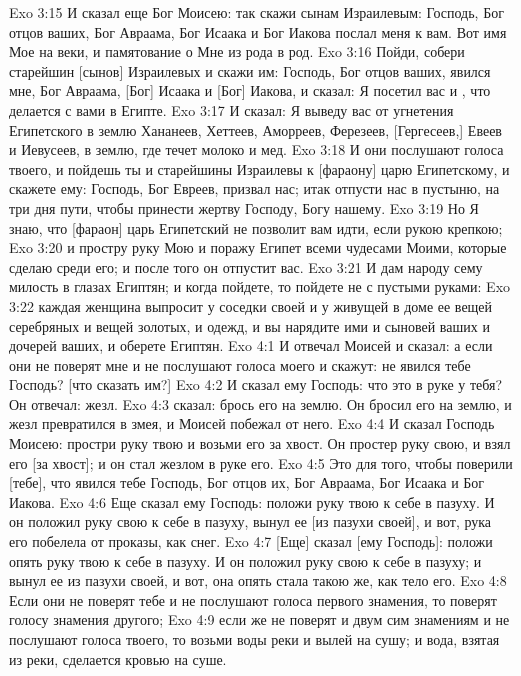 \vs Exo 3:15 И сказал еще Бог Моисею: так скажи сынам Израилевым: Господь, Бог отцов ваших, Бог Авраама, Бог Исаака и Бог Иакова послал меня к вам. Вот имя Мое на веки, и памятование о Мне из рода в род.
\vs Exo 3:16 Пойди, собери старейшин [сынов] Израилевых и скажи им: Господь, Бог отцов ваших, явился мне, Бог Авраама, [Бог] Исаака и [Бог] Иакова, и сказал: Я посетил вас и , что делается с вами в Египте.
\vs Exo 3:17 И сказал: Я выведу вас от угнетения Египетского в землю Хананеев, Хеттеев, Аморреев, Ферезеев, [Гергесеев,] Евеев и Иевусеев, в землю, где течет молоко и мед.
\vs Exo 3:18 И они послушают голоса твоего, и пойдешь ты и старейшины Израилевы к [фараону] царю Египетскому, и скажете ему: Господь, Бог Евреев, призвал нас; итак отпусти нас в пустыню, на три дня пути, чтобы принести жертву Господу, Богу нашему.
\vs Exo 3:19 Но Я знаю, что [фараон] царь Египетский не позволит вам идти, если  рукою крепкою;
\vs Exo 3:20 и простру руку Мою и поражу Египет всеми чудесами Моими, которые сделаю среди его; и после того он отпустит вас.
\vs Exo 3:21 И дам народу сему милость в глазах Египтян; и когда пойдете, то пойдете не с пустыми руками:
\vs Exo 3:22 каждая женщина выпросит у соседки своей и у живущей в доме ее вещей серебряных и вещей золотых, и одежд, и вы нарядите ими и сыновей ваших и дочерей ваших, и оберете Египтян.
\vs Exo 4:1 И отвечал Моисей и сказал: а если они не поверят мне и не послушают голоса моего и скажут: не явился тебе Господь? [что сказать им?]
\vs Exo 4:2 И сказал ему Господь: что это в руке у тебя? Он отвечал: жезл.
\vs Exo 4:3  сказал: брось его на землю. Он бросил его на землю, и жезл превратился в змея, и Моисей побежал от него.
\vs Exo 4:4 И сказал Господь Моисею: простри руку твою и возьми его за хвост. Он простер руку свою, и взял его [за хвост]; и он стал жезлом в руке его.
\vs Exo 4:5 Это для того, чтобы поверили [тебе], что явился тебе Господь, Бог отцов их, Бог Авраама, Бог Исаака и Бог Иакова.
\vs Exo 4:6 Еще сказал ему Господь: положи руку твою к себе в пазуху. И он положил руку свою к себе в пазуху, вынул ее [из пазухи своей], и вот, рука его побелела от проказы, как снег.
\vs Exo 4:7 [Еще] сказал [ему Господь]: положи опять руку твою к себе в пазуху. И он положил руку свою к себе в пазуху; и вынул ее из пазухи своей, и вот, она опять стала такою же, как тело его.
\vs Exo 4:8 Если они не поверят тебе и не послушают голоса первого знамения, то поверят голосу знамения другого;
\vs Exo 4:9 если же не поверят и двум сим знамениям и не послушают голоса твоего, то возьми воды  реки и вылей на сушу; и вода, взятая из реки, сделается кровью на суше.
